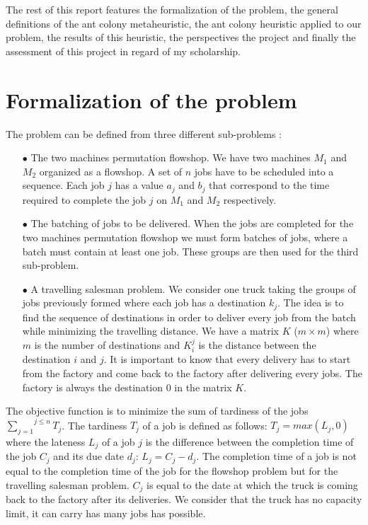 \documentclass[UTF8, twoside]{EPURapport}
\begin{document}
	The rest of this report features the formalization of the problem, the general definitions of the ant colony metaheuristic, the ant colony heuristic applied to our problem, the results of this heuristic, the perspectives the project and finally the assessment of this project in regard of my scholarship.

\chapter{Formalization of the problem}

	The problem can be defined from three different sub-problems :
	
\begin{itemize}
\item[$\bullet$] The two machines permutation flowshop. We have two machines $M_1$ and $M_2$ organized as a flowshop. A set of $n$ jobs have to be scheduled into a sequence. Each job $j$ has a value $a_j$ and $b_j$ that correspond to the time required to complete the job $j$ on $M_1$ and $M_2$ respectively.
\item[$\bullet$] The batching of jobs to be delivered. When the jobs are completed for the two machines permutation flowshop we must form batches of jobs, where a batch must contain at least one job. These groups are then used for the third sub-problem.
\item[$\bullet$] A travelling salesman problem. We consider one truck taking the groups of jobs previously formed where each job has a destination $k_j$. The idea is to find the sequence of destinations in order to deliver every job from the batch while minimizing the travelling distance. We have a matrix $K$ ($m \times m$) where $m$ is the number of destinations and $K_i^j$ is the distance between the destination $i$ and $j$. It is important to know that every delivery has to start from the factory and come back to the factory after delivering every jobs. The factory is always the destination 0 in the matrix $K$.
\end{itemize}

	The objective function is to minimize the sum of tardiness of the jobs $\overset{j \leq n}{\underset{j=1}{\sum}} T_j$. The tardiness $T_j$ of a job is defined as follows: $T_j = max(L_j, 0)$ where the lateness $L_j$  of a job $j$ is the difference between the completion time of the job $C_j$ and its due date $d_j$: $L_j = C_j - d_j$. The completion time of a job is not equal to the completion time of the job for the flowshop problem but for the travelling salesman problem. $C_j$ is equal to the date at which the truck is coming back to the factory after its deliveries.
	We consider that the truck has no capacity limit, it can carry has many jobs has possible.
\\
\end{document}
